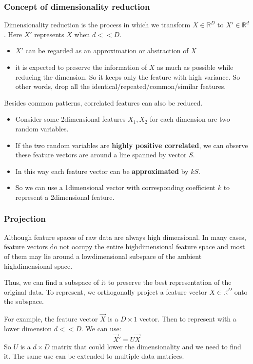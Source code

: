 \documentclass[letterpaper,12pt]{article}
\begin{document}
\subsubsection{Concept of dimensionality reduction}
Dimensionality reduction is the process in which we transform $X\in \mathbb{R}^D$ to $X'\in \mathbb{R}^d$. Here $X'$ represents $X$ when $d<<D$. 
\begin{itemize}
    \item $X'$ can be regarded as an approximation or abstraction of $X$
    \item it is expected to preserve the information of $X$ as much as possible while reducing the dimension. So it keeps only the feature with high variance. So other words, drop all the identical/repeated/common/similar features. 
\end{itemize}

Besides common patterns, correlated features can also be reduced. 
\begin{itemize}
    \item Consider some 2\-dimensional features $X_1,X_2$ for each dimension are two random variables.
    \item If the two random variables are \textbf{highly positive correlated}, we can observe these feature vectors are around a line spanned by vector $S$.
    \item In this way each feature vector can be \textbf{approximated} by $kS$.
    \item So we can use a 1\-dimensional vector with corresponding coefficient $k$ to represent a 2\-dimensional feature. 
\end{itemize}

\subsubsection{Projection}
Although feature spaces of raw data are always high dimensional. In many cases, feature vectors do not occupy the entire high\-dimensional feature space and most of them may lie around a low\-dimensional subspace of the ambient high\-dimensional space.

Thus, we can find a subspace of it to preserve the best representation of the original data. To represent, we orthogonally project a feature vector $X\in\mathbb{R}^D$ onto the subspace.

For example, the feature vector $\vec{X}$ is a $D\times 1$ vector. Then to represent with a lower dimension $d<<D$. We can use:
\[\vec{X}'=U\vec{X}\]
So $U$ is a $d\times D$ matrix that could lower the dimensionality and we need to find it. The same use can be extended to multiple data matrices.
\end{document}
